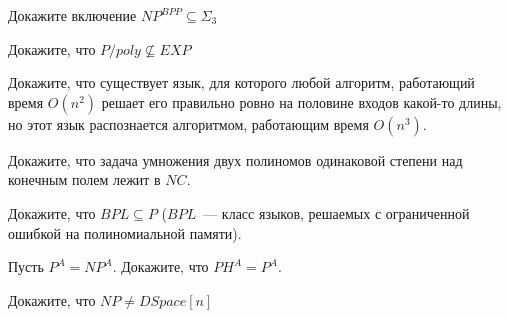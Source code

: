 \setcounter{curtask}{1}

\mytitle{}

\begin{task}
    Докажите включение $NP^{BPP} \subseteq \Sigma_3$
\end{task}

\begin{task}
    Докажите, что $P/poly \nsubseteq EXP$
\end{task}

\begin{task}
    Докажите, что существует язык, для которого любой алгоритм, работающий время
    $O(n^2)$ решает его правильно ровно на половине входов какой-то длины, но
    этот язык распознается алгоритмом, работающим время $O(n^3)$.
\end{task}

\begin{task}
    Докажите, что задача умножения двух полиномов одинаковой степени над конечным
    полем лежит в $NC$.
\end{task}

\breakline

\begin{task}
    Докажите, что $BPL \subseteq P$ ($BPL$~--- класс языков, решаемых с ограниченной
    ошибкой на полиномиальной памяти).
\end{task}

\begin{task}
    Пусть $P^{A} = NP^{A}$. Докажите, что $PH^{A} = P^{A}$.
\end{task}

\begin{task}
    Докажите, что $NP \ne DSpace[n]$
\end{task}